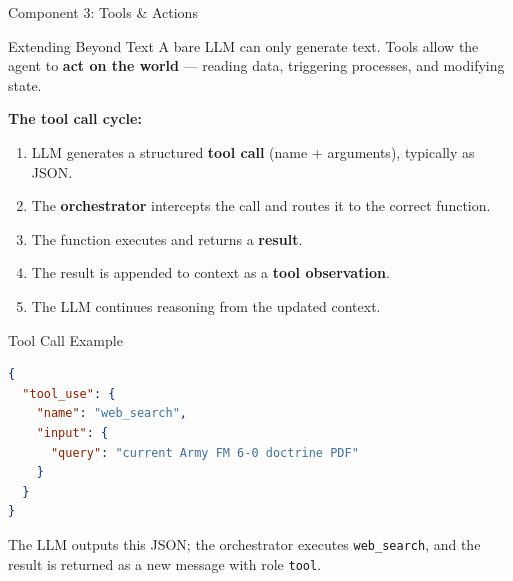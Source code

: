 \documentclass{beamer}       %
\begin{document}
\begin{frame}{Component 3: Tools \& Actions}
    \begin{block}{Extending Beyond Text}
        A bare LLM can only generate text. Tools allow the agent to \textbf{act on the world} --- reading data, triggering processes, and modifying state.
    \end{block}
    \vspace{0.2cm}
    \textbf{The tool call cycle:}
    \begin{enumerate}
        \item LLM generates a structured \textbf{tool call} (name + arguments), typically as JSON.
        \item The \textbf{orchestrator} intercepts the call and routes it to the correct function.
        \item The function executes and returns a \textbf{result}.
        \item The result is appended to context as a \textbf{tool observation}.
        \item The LLM continues reasoning from the updated context.
    \end{enumerate}
\end{frame}

\begin{frame}{Tool Call Example}
    \begin{lstlisting}[language=json, caption=Typical LLM Tool Call (OpenAI format)]
{
  "tool_use": {
    "name": "web_search",
    "input": {
      "query": "current Army FM 6-0 doctrine PDF"
    }
  }
}
    \end{lstlisting}
    \vspace{0.1cm}
    \small The LLM outputs this JSON; the orchestrator executes \texttt{web\_search}, and the result is returned as a new message with role \texttt{tool}.
\end{frame}
\end{document}

